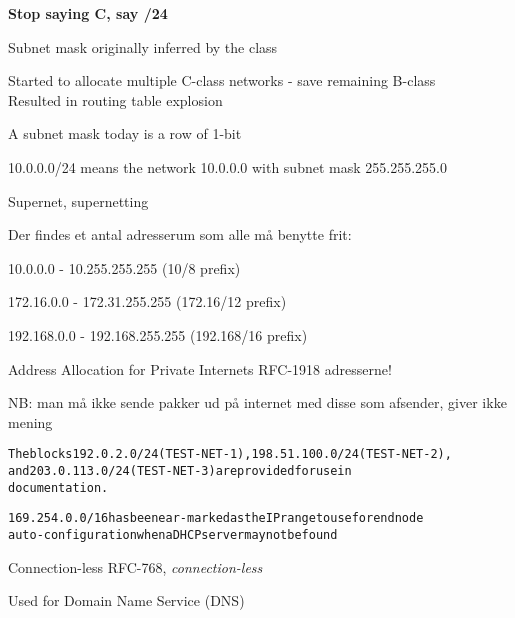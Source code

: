 \documentclass[Screen16to9,17pt]{foils}
\begin{document}
\vskip 5mm
\centerline{\bf Stop saying C, say /24}



\begin{list1}
\item Subnet mask originally inferred by the class
\item Started to allocate multiple C-class networks - save remaining B-class\\
Resulted in routing table explosion
\item A subnet mask today is a row of 1-bit
\item 10.0.0.0/24 means the network 10.0.0.0 with subnet mask 255.255.255.0
\item Supernet, supernetting
\end{list1}



\begin{list1}
\item Der findes et antal adresserum som alle må benytte frit:
\begin{list2}
\item 10.0.0.0    -  10.255.255.255  (10/8 prefix)
\item 172.16.0.0  -  172.31.255.255  (172.16/12 prefix)
\item 192.168.0.0 -  192.168.255.255 (192.168/16 prefix)
\end{list2}
\item Address Allocation for Private Internets RFC-1918 adresserne!
\item NB: man må ikke sende pakker ud på internet med disse som afsender, giver ikke mening
\end{list1}

\begin{alltt}
The blocks 192.0.2.0/24 (TEST-NET-1), 198.51.100.0/24 (TEST-NET-2),
and 203.0.113.0/24 (TEST-NET-3) are provided for use in
documentation.

169.254.0.0/16 has been ear-marked as the IP range to use for end node
auto-configuration when a DHCP server may not be found
\end{alltt}



\begin{list1}
\item Connection-less RFC-768, \emph{connection-less}
\item Used for Domain Name Service (DNS)
\end{list1}
\end{document}
